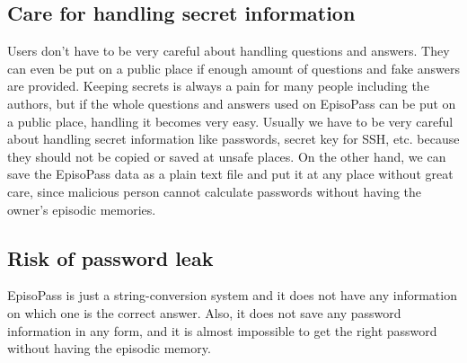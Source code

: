 \documentclass[runningheads,a4paper]{llncs}
\begin{document}
%
%


\subsection{Care for handling secret information}

Users don't have to be very careful about handling questions and answers.
They can even be put on a public place
if enough amount of questions and fake answers are provided.
%
Keeping secrets is always a pain for many people including
the authors, but if the whole questions and answers used on EpisoPass
can be put on a public place,
handling it becomes very easy.
Usually we have to be very careful about handling
secret information like passwords, secret key for SSH, etc.
because they should not be copied or saved at unsafe places.
On the other hand,
we can save the EpisoPass data as a plain text file and put it at
any place without great care, since malicious person cannot calculate
passwords without having the owner's episodic memories.

\subsection{Risk of password leak}

EpisoPass is just a string-conversion system and it does not
have any information on which one is the correct answer.
Also, it does not save any password information in any form, and
it is almost impossible to get the right password 
without having the episodic memory.

\end{document}
